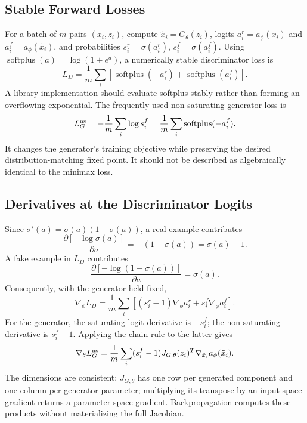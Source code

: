 \documentclass[conference]{IEEEtran}
\begin{document}
\subsection{Stable Forward Losses}
For a batch of $m$ pairs $(x_i,z_i)$, compute $\tilde x_i=G_\theta(z_i)$, logits $a_i^r=a_\phi(x_i)$ and $a_i^f=a_\phi(\tilde x_i)$, and probabilities $s_i^r=\sigma(a_i^r)$, $s_i^f=\sigma(a_i^f)$. Using $\operatorname{softplus}(a)=\log(1+e^a)$, a numerically stable discriminator loss is
\begin{equation}
L_D=\frac1m\sum_i[\operatorname{softplus}(-a_i^r)+\operatorname{softplus}(a_i^f)].
\end{equation}
A library implementation should evaluate softplus stably rather than forming an overflowing exponential. The frequently used non-saturating generator loss is
\begin{equation}
L_G^{\rm ns}=-\frac1m\sum_i\log s_i^f=\frac1m\sum_i\operatorname{softplus}(-a_i^f).
\end{equation}
It changes the generator's training objective while preserving the desired distribution-matching fixed point. It should not be described as algebraically identical to the minimax loss.

\subsection{Derivatives at the Discriminator Logits}
Since $\sigma'(a)=\sigma(a)(1-\sigma(a))$, a real example contributes
\begin{equation}
\frac{\partial[-\log\sigma(a)]}{\partial a}=-(1-\sigma(a))=\sigma(a)-1.
\end{equation}
A fake example in $L_D$ contributes
\begin{equation}
\frac{\partial[-\log(1-\sigma(a))]}{\partial a}=\sigma(a).
\end{equation}
Consequently, with the generator held fixed,
\begin{equation}
\nabla_\phi L_D=\frac1m\sum_i[(s_i^r-1)\nabla_\phi a_i^r+s_i^f\nabla_\phi a_i^f].
\end{equation}
For the generator, the saturating logit derivative is $-s_i^f$; the non-saturating derivative is $s_i^f-1$. Applying the chain rule to the latter gives
\begin{equation}
\nabla_\theta L_G^{\rm ns}=\frac1m\sum_i (s_i^f-1)J_{G,\theta}(z_i)^T\nabla_{\tilde x_i}a_\phi(\tilde x_i).\label{eq:chain}
\end{equation}
The dimensions are consistent: $J_{G,\theta}$ has one row per generated component and one column per generator parameter; multiplying its transpose by an input-space gradient returns a parameter-space gradient. Backpropagation computes these products without materializing the full Jacobian.
\end{document}
